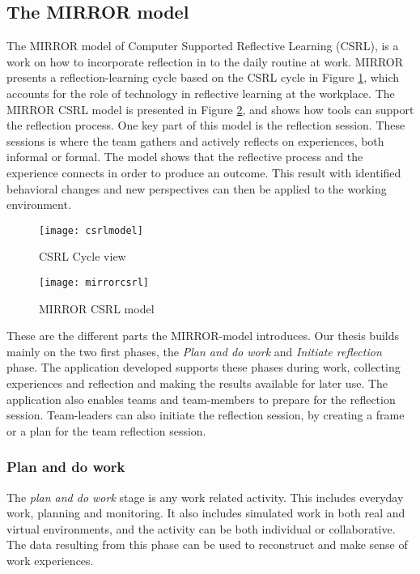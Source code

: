 \subsection{The MIRROR model}
\label{mirrorsection}
The MIRROR model of Computer Supported Reflective Learning (CSRL), is a work on how to incorporate reflection in to the daily routine at work. 
MIRROR presents a reflection-learning cycle based on the CSRL cycle in Figure \ref{csrlmodel}, which accounts for the role of technology in reflective learning at the workplace. The MIRROR CSRL model is presented in Figure \ref{mirrormodel}, and shows how tools can support the reflection process. One key part of this model is the reflection session. These sessions is where the team gathers and actively reflects on experiences, both informal or formal. The model shows that the reflective process and the experience connects in order to produce an outcome. This result with identified behavioral changes and new perspectives can then be applied to the working environment. 
\begin{figure}[!htpb]
\label{csrlmodel}
\centering
	\texttt{[image: csrlmodel]}
\caption{CSRL Cycle view}
\end{figure}

\begin{figure}[h!]
\centering
	\texttt{[image: mirrorcsrl]}
\caption{MIRROR CSRL model}
\label{mirrormodel}
\end{figure}
% 
%
These are the different parts the MIRROR-model introduces. Our thesis builds mainly on the two first phases, the \emph{Plan and do work} and \emph{Initiate reflection} phase. The application developed supports these phases during work, collecting experiences and reflection and making the results available for later use. The application also enables teams and team-members to prepare for the reflection session. Team-leaders can also initiate the reflection session, by creating a frame or a plan for the team reflection session. 
\subsubsection{Plan and do work}
The \emph{plan and do work} stage is any work related activity. This includes everyday work, planning and monitoring. It also includes simulated work in both real and virtual environments, and the activity can be both individual or collaborative. The data resulting from this phase can be used to reconstruct and make sense of work experiences. 

